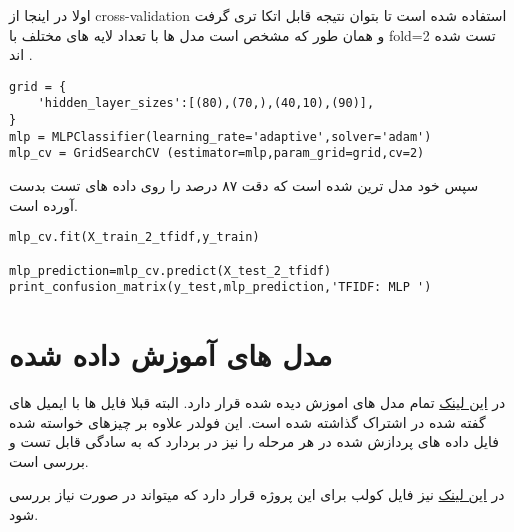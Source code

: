 \documentclass{article}[12pt]
\begin{document}
اولا در اینجا از cross-validation 
استفاده شده است تا بتوان نتیجه قابل اتکا تری گرفت و همان طور که مشخص است مدل ها با تعداد لایه های مختلف با fold=2 تست شده اند .
\begin{verbatim}
grid = {
    'hidden_layer_sizes':[(80),(70,),(40,10),(90)],
}
mlp = MLPClassifier(learning_rate='adaptive',solver='adam')
mlp_cv = GridSearchCV (estimator=mlp,param_grid=grid,cv=2)
\end{verbatim}

سپس خود مدل ترین شده است که دقت ۸۷ درصد را روی داده های تست بدست آورده است. 

\begin{verbatim}
mlp_cv.fit(X_train_2_tfidf,y_train)

mlp_prediction=mlp_cv.predict(X_test_2_tfidf)
print_confusion_matrix(y_test,mlp_prediction,'TFIDF: MLP ')
\end{verbatim}

\section{مدل های آموزش داده شده}

در 
\href{https://drive.google.com/drive/folders/1D5jG-peWyejoISFjyc0e8d_Y44frkL7f?usp=sharing}{این لینک}
تمام مدل های اموزش دیده شده قرار دارد. البته قبلا فایل ها با ایمیل های گفته شده در اشتراک گذاشته شده است. این فولدر علاوه بر چیزهای خواسته شده فایل داده های پردازش شده در هر مرحله را نیز در بردارد که به سادگی قابل تست و بررسی است. 

در 
\href{https://colab.research.google.com/drive/1sJm7jiWMMvYRwHK2Ibltt_kKa776yOrU?usp=sharing}{این لینک}
نیز فایل کولب برای این پروژه قرار دارد که میتواند در صورت نیاز بررسی شود. 
\end{document}
